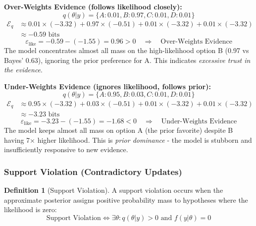 \documentclass{article}
\theoremstyle{definition}
\newtheorem{definition}{Definition}
\begin{document}
\textbf{Over-Weights Evidence (follows likelihood closely):}
\begin{equation*}
q(\theta|y) = \{A: 0.01, B: 0.97, C: 0.01, D: 0.01\}
\end{equation*}
\begin{align*}
\mathcal{E}_q &\approx 0.01 \times (-3.32) + 0.97 \times (-0.51) + 0.01 \times (-3.32) + 0.01 \times (-3.32) \\
&\approx -0.59 \text{ bits}
\end{align*}
\begin{equation*}
\varepsilon_{\text{like}} = -0.59 - (-1.55) = 0.96 > 0 \quad \Rightarrow \quad \text{Over-Weights Evidence}
\end{equation*}
The model concentrates almost all mass on the high-likelihood option B (0.97 vs Bayes' 0.63), ignoring the prior preference for A. This indicates \emph{excessive trust in the evidence}.

\textbf{Under-Weights Evidence (ignores likelihood, follows prior):}
\begin{equation*}
q(\theta|y) = \{A: 0.95, B: 0.03, C: 0.01, D: 0.01\}
\end{equation*}
\begin{align*}
\mathcal{E}_q &\approx 0.95 \times (-3.32) + 0.03 \times (-0.51) + 0.01 \times (-3.32) + 0.01 \times (-3.32) \\
&\approx -3.23 \text{ bits}
\end{align*}
\begin{equation*}
\varepsilon_{\text{like}} = -3.23 - (-1.55) = -1.68 < 0 \quad \Rightarrow \quad \text{Under-Weights Evidence}
\end{equation*}
The model keeps almost all mass on option A (the prior favorite) despite B having 7× higher likelihood. This is \emph{prior dominance} - the model is stubborn and insufficiently responsive to new evidence.

\subsubsection{Support Violation (Contradictory Updates)}

\begin{definition}[Support Violation]
A support violation occurs when the approximate posterior assigns positive probability mass to hypotheses where the likelihood is zero:
\begin{equation}
\text{Support Violation} \iff \exists \theta: q(\theta|y) > 0 \text{ and } f(y|\theta) = 0
\end{equation}
\end{definition}
\end{document}
